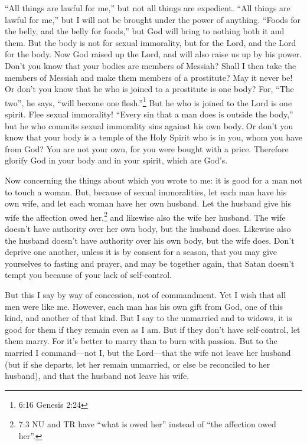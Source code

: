 \myverse{}“All things are lawful for me,” but not all things are expedient.
“All things are lawful for me,” but I will not be brought under the power of anything.
\myverse{}“Foods for the belly, and the belly for foods,” but God will bring to nothing
both it and them. But the body is not for sexual immorality, but for the Lord, and the Lord for the body.
\myverse{}Now God raised up the Lord, and will also raise us up by his power.
\myverse{}Don’t you know that your bodies are members of Messiah? Shall I then take
the members of Messiah and make them members of a prostitute? May it never be!
\myverse{}Or don’t you know that he who is joined to a prostitute is one body? For,
“The two”, he says, “will become one flesh.”\footnote{6:16 Genesis 2:24}
\myverse{}But he who is joined to the Lord is one spirit.
\myverse{}Flee sexual immorality! “Every sin that a man does is outside the body,” but
he who commits sexual immorality sins against his own body.
\myverse{}Or don’t you know that your body is a temple of the Holy Spirit who is in
you, whom you have from God? You are not your own,
\myverse{}for you were bought with a price. Therefore glorify God in your body and in
your spirit, which are God’s.


\mychapter{} \myverse*{}Now concerning the things about which you wrote to me: it is good
for a man not to touch a woman.
\myverse{}But, because of sexual immoralities, let each man have his own wife, and let
each woman have her own husband.
\myverse{}Let the husband give his wife the affection owed her,\footnote{7:3 NU and TR have “what is owed her” instead of “the affection owed her”.} and likewise
also the wife her husband.
\myverse{}The wife doesn’t have authority over her own body, but the husband does. Likewise
also the husband doesn’t have authority over his own body, but the wife does.
\myverse{}Don’t deprive one another, unless it is by consent for a season, that you may
give yourselves to fasting and prayer, and may be together again, that Satan doesn’t tempt you because
of your lack of self-control.

\myverse{}But this I say by way of concession, not of commandment.
\myverse{}Yet I wish that all men were like me. However, each man has his own gift from
God, one of this kind, and another of that kind.
\myverse{}But I say to the unmarried and to widows, it is good for them if they remain
even as I am.
\myverse{}But if they don’t have self-control, let them marry. For it’s better to marry
than to burn with passion.
\myverse{}But to the married I command—not I, but the Lord—that the wife not leave her
husband
\myverse{}(but if she departs, let her remain unmarried, or else be reconciled to her
husband), and that the husband not leave his wife.

